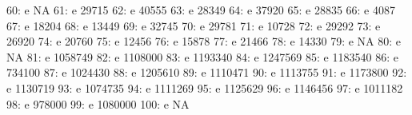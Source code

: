 \documentclass[nojss]{jss}
\begin{document}
\begin{Schunk}
\begin{Soutput}
 60:                               e                         NA
 61:                               e                      29715
 62:                               e                      40555
 63:                               e                      28349
 64:                               e                      37920
 65:                               e                      28835
 66:                               e                       4087
 67:                               e                      18204
 68:                               e                      13449
 69:                               e                      32745
 70:                               e                      29781
 71:                               e                      10728
 72:                               e                      29292
 73:                               e                      26920
 74:                               e                      20760
 75:                               e                      12456
 76:                               e                      15878
 77:                               e                      21466
 78:                               e                      14330
 79:                               e                         NA
 80:                               e                         NA
 81:                               e                    1058749
 82:                               e                    1108000
 83:                               e                    1193340
 84:                               e                    1247569
 85:                               e                    1183540
 86:                               e                     734100
 87:                               e                    1024430
 88:                               e                    1205610
 89:                               e                    1110471
 90:                               e                    1113755
 91:                               e                    1173800
 92:                               e                    1130719
 93:                               e                    1074735
 94:                               e                    1111269
 95:                               e                    1125629
 96:                               e                    1146456
 97:                               e                    1011182
 98:                               e                     978000
 99:                               e                    1080000
100:                               e                         NA

\end{Soutput}
\end{Schunk}
\end{document}
